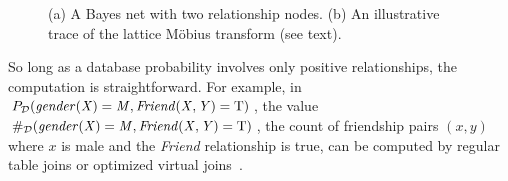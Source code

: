 \documentclass{article}
\begin{document}
\begin{figure}[tb]
\begin{center}
\caption{(a) A Bayes net with two relationship nodes. (b) An illustrative trace of the lattice M\"obius transform (see text). 
\label{fig:example}}
\end{center}
\end{figure}



So long as a database probability involves only positive relationships,
the computation is straightforward. 
For example, in 
$P_{\mathcal{D}}(\it{gender}(X) = M, \it{Friend}(X,Y) = \mathrm{T})$, the value  $\#_{\mathcal{D}}(\it{gender}(X) = M, \it{Friend}(X,Y) = \mathrm{T})$, the count of friendship pairs $(x,y)$ where $x$ is male and the
{\em Friend} relationship is true, can be computed by regular table joins or optimized virtual joins~\cite{Yin2004}. 
\end{document}
